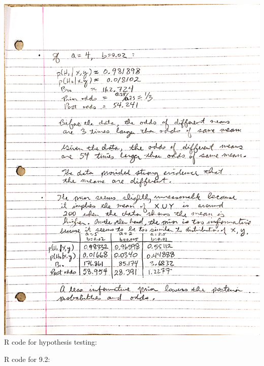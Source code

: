 \documentclass{article}
\begin{document}
\includegraphics[scale = 0.23]{page3.jpg} \\

\pagebreak
R code for hypothesis testing:

\pagebreak
R code for 9.2:
\end{document}
